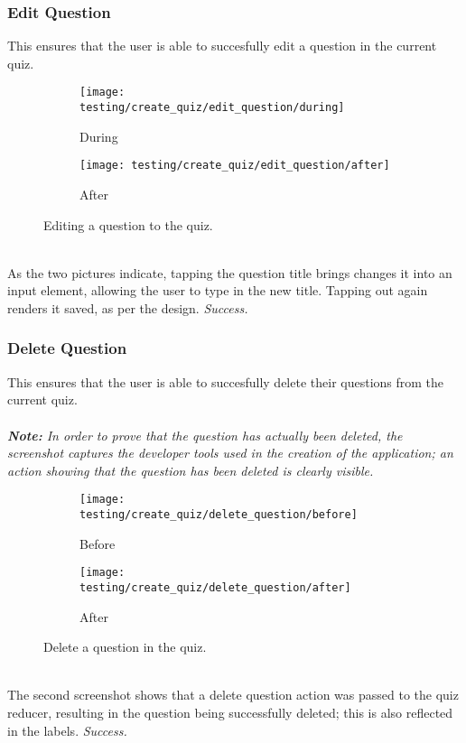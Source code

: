 \subsubsection{Edit Question} %
\label{ssub:edit_question}
This ensures that the user is able to succesfully edit a question in the current quiz.
\begin{figure}[!htbp]
\begin{subfigure}{0.5\textwidth}
  \centering
  \texttt{[image: testing/create\_quiz/edit\_question/during]}
  \caption{During}
  \label{fig:sub2}
\end{subfigure}
\begin{subfigure}{0.5\textwidth}
  \centering
  \texttt{[image: testing/create\_quiz/edit\_question/after]}
  \caption{After}
  \label{fig:sub3}
\end{subfigure}
\caption{Editing a question to the quiz.}
\label{fig:test}
\end{figure}
\\As the two pictures indicate, tapping the question title brings changes it into an input element, allowing the user to type in the new title. Tapping out again renders it saved, as per the design. \textit{Success.}


\subsubsection{Delete Question} %
\label{ssub:delete_question}
This ensures that the user is able to succesfully delete their questions from the current quiz.
\\\\\textit{\textbf{Note:} In order to prove that the question has actually been deleted, the screenshot captures the developer tools used in the creation of the application; an action showing that the question has been deleted is clearly visible.}
\begin{figure}[!htbp]
\centering
\begin{subfigure}{0.5\textwidth}
  \centering
  \texttt{[image: testing/create\_quiz/delete\_question/before]}
  \caption{Before}
  \label{fig:sub1}
\end{subfigure}%
\begin{subfigure}{0.5\textwidth}
  \centering
  \texttt{[image: testing/create\_quiz/delete\_question/after]}
  \caption{After}
  \label{fig:sub2}
\end{subfigure}
\caption{Delete a question in the quiz.}
\label{fig:test}
\end{figure}
\\The second screenshot shows that a delete question action was passed to the quiz reducer, resulting in the question being successfully deleted; this is also reflected in the labels. \textit{Success.}


